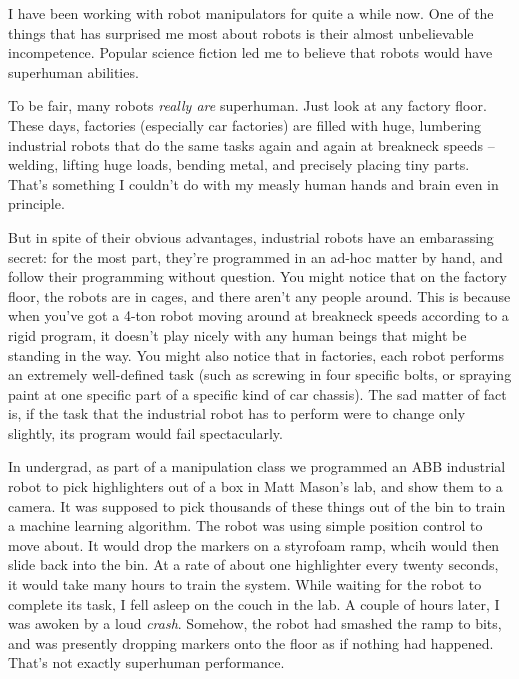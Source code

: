I have been working with robot manipulators for quite a while now. One of the things that has surprised me most about robots is their almost unbelievable incompetence. Popular science fiction led me to believe that robots would have superhuman abilities. 

To be fair, many robots \textit{really are} superhuman. Just look at any factory floor. These days, factories (especially car factories) are filled with huge, lumbering industrial robots that do the same tasks again and again at breakneck speeds -- welding, lifting huge loads, bending metal, and precisely placing tiny parts. That's something I couldn't do with my measly human hands and brain even in principle.

But in spite of their obvious advantages, industrial robots have an embarassing secret: for the most part, they're programmed in an ad-hoc matter by hand, and follow their programming without question. You might notice that on the factory floor, the robots are in cages, and there aren't any people around. This is because when you've got a 4-ton robot moving around at breakneck speeds according to a rigid program, it doesn't play nicely with any human beings that might be standing in the way. You might also notice that in factories, each robot performs an extremely well-defined task (such as screwing in four specific bolts, or spraying paint at one specific part of a specific kind of car chassis). The sad matter of fact is, if the task that the industrial robot has to perform were to change only slightly, its program would fail spectacularly.

In undergrad, as part of a manipulation class we programmed an ABB industrial robot to pick highlighters out of a box in Matt Mason's lab, and show them to a camera. It was supposed to pick thousands of these things out of the bin to train a machine learning algorithm. The robot was using simple position control to move about. It would drop the markers on a styrofoam ramp, whcih would then slide back into the bin. At a rate of about one highlighter every twenty seconds, it would take many hours to train the system. While waiting for the robot to complete its task, I fell asleep on the couch in the lab. A couple of hours later, I was awoken by a loud \textit{crash}. Somehow, the robot had smashed the ramp to bits, and was presently dropping markers onto the floor as if nothing had happened. That's not exactly superhuman performance.

